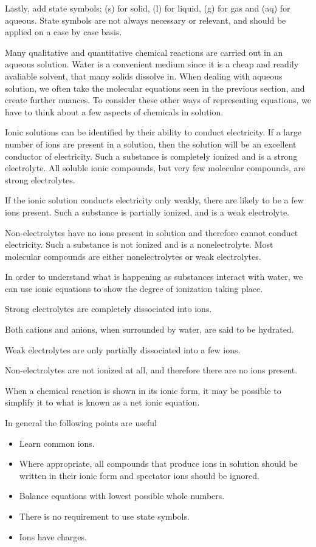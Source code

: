 \documentclass[../chem.tex]{subfiles}
\begin{document}
Lastly, add state symbols; (s) for solid, (l) for liquid, (g) for gas and (aq) for aqueous. State symbols are not always necessary or relevant, and should be applied on a case by case basis.

Many qualitative and quantitative chemical reactions are carried out in an aqueous solution. Water is a convenient medium since it is a cheap 
and readily avaliable solvent, that many solids dissolve in. When dealing with aqueous solution, we often take the molecular equations seen in the previous section, and 
create further nuances. To consider these other ways of representing equations, we have to think about a few aspects of chemicals in solution.

Ionic solutions can be identified by their ability to conduct electricity. If a large number of ions are present in a solution, then the solution will 
be an excellent conductor of electricity. Such a substance is completely ionized and is a strong electrolyte. All soluble ionic compounds, but very few molecular compounds, are strong electrolytes.

If the ionic solution conducts electricity only weakly, there are likely to be a few ions present. Such a substance is partially ionized, and is a weak electrolyte.

Non-electrolytes have no ions present in solution and therefore cannot conduct electricity. Such a substance is not ionized and is a 
nonelectrolyte. Most molecular compounds are either nonelectrolytes or weak electrolytes.

In order to understand what is happening as substances interact with water, we can use ionic equations to show the degree of ionization taking place.

Strong electrolytes are completely dissociated into ions.

Both cations and anions, when surrounded by water, are said to be hydrated.

Weak electrolytes are only partially dissociated into a few ions.

Non-electrolytes are not ionized at all, and therefore there are no ions present. 

When a chemical reaction is shown in its ionic form, it may be possible to simplify it to what is known as a net ionic equation. 

In general the following points are useful
\begin{itemize}
    \item Learn common ions.
    \item Where appropriate, all compounds that produce ions in solution should be written in their ionic form and spectator ions should be ignored.
    \item Balance equations with lowest possible whole numbers.
    \item There is no requirement to use state symbols.
    \item Ions have charges.
\end{itemize}
\end{document}

